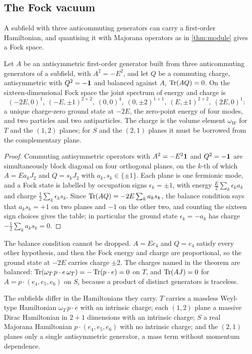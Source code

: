 \subsection{The Fock vacuum}

A subfield with three anticommuting generators can carry a first-order Hamiltonian, and quantising it with Majorana operators as in
\cref{thm:module} gives a Fock space.

\begin{theorem}
\label{thm:subfock}
Let $A$ be an antisymmetric first-order generator built from three anticommuting generators of a subfield, with $A^2=-E^2$, and let $Q$ be a
commuting charge, antisymmetric with $Q^2=-\mathbf 1$ and balanced against $A$, $\operatorname{Tr}(AQ)=0$. On the sixteen-dimensional Fock space the joint spectrum of
energy and charge is
\[
(-2E,0)^{1},\ (-E,\pm1)^{2+2},\ (0,0)^4,\ (0,\pm2)^{1+1},\ (E,\pm1)^{2+2},\ (2E,0)^1 :
\]
a unique charge-zero ground state at $-2E$, the zero-point energy of four modes, and two particles and two antiparticles. The charge is the
volume element $\omega_W$ for $T$ and the $(1,2)$ planes; for $S$ and the $(2,1)$ planes it must be borrowed from the complementary plane.
\end{theorem}

\begin{proof}
Commuting antisymmetric operators with $A^2=-E^2\mathbf 1$ and $Q^2=-\mathbf 1$ are simultaneously block diagonal on four orthogonal planes, on the $k$-th of which
$A=Ea_kJ_2$ and $Q=s_kJ_2$ with $a_k,s_k\in\{\pm1\}$. Each plane is one fermionic mode, and a Fock state is labelled by occupation signs $\epsilon_k=\pm1$, with energy
$\tfrac E2\sum_k\epsilon_ka_k$ and charge $\tfrac12\sum_k\epsilon_ks_k$. Since $\operatorname{Tr}(AQ)=-2E\sum_ka_ks_k$, the balance condition says that $a_ks_k=+1$ on two planes and
$-1$ on the other two, and counting the sixteen sign choices gives the table; in particular the ground state $\epsilon_k=-a_k$ has charge
$-\tfrac12\sum_ka_ks_k=0$.
\end{proof}

The balance condition cannot be dropped. $A=Ee_4$ and $Q=e_4$ satisfy every other hypothesis, and then the Fock energy and charge are proportional, so the
ground state at $-2E$ carries charge $\pm2$. The charges named in the theorem are balanced: $\operatorname{Tr}(\omega_T\,p\cdot e\,\omega_T)=-\operatorname{Tr}(p\cdot e)=0$ on $T$, and
$\operatorname{Tr}(AJ)=0$ for $A=p\cdot(e_4,e_5,e_6)$ on $S$, because a product of distinct generators is traceless.

The subfields differ in the Hamiltonians they carry. $T$ carries a massless Weyl-type Hamiltonian $\omega_T\,p\cdot e$ with an intrinsic charge;
each $(1,2)$ plane a massive Dirac Hamiltonian in $2{+}1$ dimensions with an intrinsic charge; $S$ a real Majorana Hamiltonian $p\cdot(e_4,e_5,e_6)$
with no intrinsic charge; and the $(2,1)$ planes only a single antisymmetric generator, a mass term without momentum dependence.

